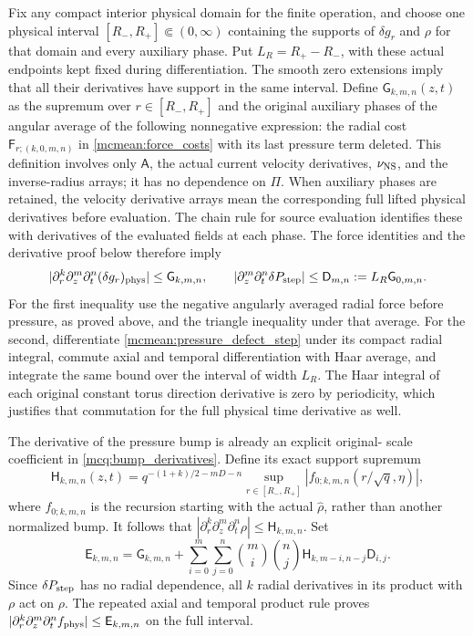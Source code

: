 \documentclass[11pt]{article}
\begin{document}
Fix any compact interior physical domain for the finite operation,
and choose one physical interval \([R_-,R_+]\Subset(0,\infty)\)
containing the supports of \(\delta g_r\) and \(\rho\) for that
domain and every auxiliary phase. Put \(L_R=R_+-R_-\), with these
actual endpoints kept fixed during differentiation. The smooth zero
extensions imply that all their derivatives have support in the
same interval. Define \(\mathsf G_{k,m,n}(z,t)\) as the supremum
over \(r\in[R_-,R_+]\) and the original auxiliary phases of the
angular average of the following nonnegative expression: the radial
cost \(\mathsf F_{r;(k,0,m,n)}\) in \eqref{mcmean:force_costs}
with its last pressure term deleted. This definition involves only
\(\mathsf A\), the actual current velocity derivatives,
\(\nu_{\rm NS}\), and the inverse-radius arrays; it has no
dependence on \(\mathsf\Pi\). When auxiliary phases are retained,
the velocity derivative arrays mean the corresponding full lifted
physical derivatives before evaluation. The chain rule for source
evaluation identifies these with derivatives of the evaluated fields
at each phase. The force identities and the derivative proof below
therefore imply
\[
 |\partial_r^k\partial_z^m\partial_t^n(\delta g_r)_{\rm phys}|
       \le\mathsf G_{k,m,n},\qquad
 |\partial_z^m\partial_t^n\delta P_{\rm step}|
       \le\mathsf D_{m,n}:=L_R\mathsf G_{0,m,n}.
\]
For the first inequality use the negative angularly averaged radial
force before pressure, as proved above, and the triangle inequality
under that average. For the second, differentiate
\eqref{mcmean:pressure_defect_step} under its compact radial
integral, commute axial and temporal differentiation with Haar
average, and integrate the same bound over the interval of width
\(L_R\). The Haar integral of each original constant torus
direction derivative is zero by periodicity, which justifies that
commutation for the full physical time derivative as well.

The derivative of the pressure bump is already an explicit original-
scale coefficient in \eqref{mcq:bump_derivatives}. Define its exact
support supremum
\[
 \mathsf H_{k,m,n}(z,t)
 =q^{-(1+k)/2-mD-n}
    \sup_{r\in[R_-,R_+]}
       |f_{0;k,m,n}(r/\sqrt q,\eta)|,
\]
where \(f_{0;k,m,n}\) is the recursion starting with the actual
\(\widehat\rho\), rather than another normalized bump.
It follows that \(|\partial_r^k\partial_z^m\partial_t^n\rho|
\le\mathsf H_{k,m,n}\). Set
\begin{equation}\label{mcmean:pressure_source_cost}
 \mathsf E_{k,m,n}
 =\mathsf G_{k,m,n}
 +\sum_{i=0}^m\sum_{j=0}^n\binom mi\binom nj
        \mathsf H_{k,m-i,n-j}\mathsf D_{i,j}.
\end{equation}
Since \(\delta P_{\rm step}\) has no radial dependence, all
\(k\) radial derivatives in its product with \(\rho\) act on
\(\rho\). The repeated axial and temporal product rule proves
\(|\partial_r^k\partial_z^m\partial_t^n f_{\rm phys}|
\le\mathsf E_{k,m,n}\) on the full interval.
\end{document}

